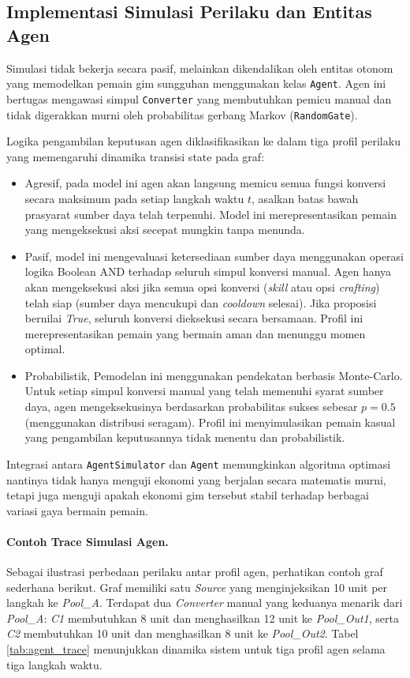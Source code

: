 \subsection{Implementasi  Simulasi Perilaku dan Entitas Agen}

Simulasi tidak bekerja secara pasif, melainkan dikendalikan oleh entitas otonom yang memodelkan pemain gim sungguhan menggunakan kelas \texttt{Agent}. Agen ini bertugas mengawasi simpul \texttt{Converter} yang membutuhkan pemicu manual dan tidak digerakkan murni oleh probabilitas gerbang Markov (\texttt{RandomGate}).

Logika pengambilan keputusan agen diklasifikasikan ke dalam tiga profil perilaku yang memengaruhi dinamika transisi state pada graf:

\begin{itemize}
    \item Agresif, pada model ini agen akan langsung memicu semua fungsi konversi secara maksimum pada setiap langkah waktu $t$, asalkan batas bawah prasyarat sumber daya telah terpenuhi. Model ini merepresentasikan pemain yang mengeksekusi aksi secepat mungkin tanpa menunda.
    \item Pasif, model ini mengevaluasi ketersediaan sumber daya menggunakan operasi logika Boolean AND terhadap seluruh simpul konversi manual. Agen hanya akan mengeksekusi aksi jika semua opsi konversi (\textit{skill} atau opsi \textit{crafting}) telah siap (sumber daya mencukupi dan \textit{cooldown} selesai). Jika proposisi bernilai \textit{True}, seluruh konversi dieksekusi secara bersamaan. Profil ini merepresentasikan pemain yang bermain aman dan menunggu momen optimal.
    \item Probabilistik, Pemodelan ini menggunakan pendekatan berbasis Monte-Carlo. Untuk setiap simpul konversi manual yang telah memenuhi syarat sumber daya, agen mengeksekusinya berdasarkan probabilitas sukses sebesar $p = 0.5$ (menggunakan distribusi seragam). Profil ini menyimulasikan pemain kasual yang pengambilan keputusannya tidak menentu dan probabilistik.
\end{itemize}

Integrasi antara \texttt{AgentSimulator} dan \texttt{Agent} memungkinkan algoritma optimasi nantinya tidak hanya menguji ekonomi yang berjalan secara matematis murni, tetapi juga menguji apakah ekonomi gim tersebut stabil terhadap berbagai variasi gaya bermain pemain.

\paragraph{Contoh Trace Simulasi Agen.}
Sebagai ilustrasi perbedaan perilaku antar profil agen, perhatikan contoh graf sederhana berikut. Graf memiliki satu \textit{Source} yang menginjeksikan 10 unit per langkah ke \textit{Pool\_A}. Terdapat dua \textit{Converter} manual yang keduanya menarik dari \textit{Pool\_A}: \textit{C1} membutuhkan 8 unit dan menghasilkan 12 unit ke \textit{Pool\_Out1}, serta \textit{C2} membutuhkan 10 unit dan menghasilkan 8 unit ke \textit{Pool\_Out2}. Tabel \ref{tab:agent_trace} menunjukkan dinamika sistem untuk tiga profil agen selama tiga langkah waktu.


